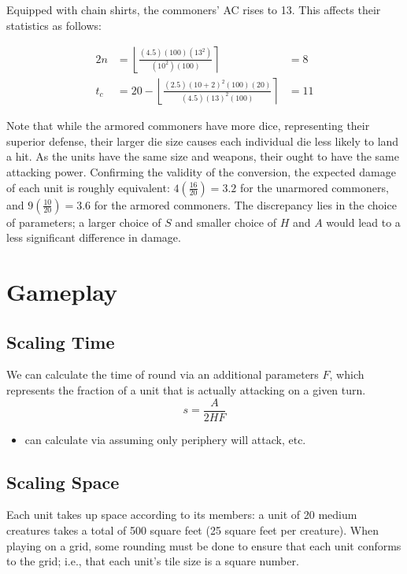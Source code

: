 \documentclass[twocolumn]{article}
\begin{document}
Equipped with chain shirts, the commoners' AC rises to 13.
This affects their statistics as follows:

\begin{alignat*}{2}
    n   &=  
        \left\lfloor
            \frac
                {(4.5) (100) (13^2)}
                {(10^2) (100)}
        \right\rceil
            &= 8
    \\
    t_c &=
        20 - 
        \left\lfloor
            \frac
                {(2.5) (10 + 2)^2 (100) (20)}
                {(4.5) (13)^2 (100)}
        \right\rceil
            &= 11
\end{alignat*}

Note that while the armored commoners have more dice,
representing their superior defense,
their larger die size causes each individual die less likely to land a hit.
As the units have the same size and weapons,
their ought to have the same attacking power.
Confirming the validity of the conversion,
the expected damage of each unit is roughly equivalent:
$4(\frac{16}{20}) = 3.2$ for the unarmored commoners,
and $9(\frac{10}{20}) = 3.6$ for the armored commoners.
The discrepancy lies in the choice of parameters;
a larger choice of $S$ and smaller choice of $H$ and $A$
would lead to a less significant difference in damage.

\section{Gameplay}\label{sec:game}

\subsection{Scaling Time}
We can calculate the time of round via an additional parameters $F$,
which represents the fraction of a unit that is actually attacking on a given turn.
\[
    s = \frac
        {A}
        {2 H F}
\]
\begin{itemize}
    \item can calculate via assuming only periphery will attack, etc.
\end{itemize}
\subsection{Scaling Space}

Each unit takes up space according to its members:
a unit of 20 medium creatures takes a total of 500 square feet (25 square feet per creature).
When playing on a grid,
some rounding must be done to ensure that each unit conforms to the grid;
i.e., that each unit's tile size is a square number.
\end{document}
